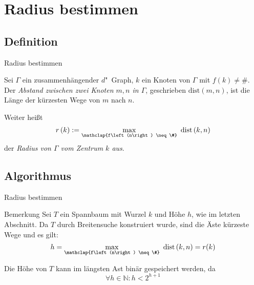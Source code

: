 \documentclass[18pt]{beamer}
\newcommand{\defWord}[1]{\emph{#1}}
\begin{document}
\section{Radius bestimmen}
\subsection{Definition}
\begin{frame}{Radius bestimmen}
	\begin{definition}[Abstand]
		Sei $\Gamma$ ein zusammenhängender $d$"~Graph, $k$ ein Knoten von $\Gamma$ mit $f\left(k\right) \neq \#$.
		Der \defWord{Abstand zwischen zwei Knoten $m, n$ in $\Gamma$}, geschrieben $\text{dist}\left(m , n\right)$, ist die Länge der kürzesten Wege von $m$ nach $n$.
	\end{definition}
	\begin{definition}[Radius]
		Weiter heißt
		\begin{displaymath}
			r\left(k\right) := \max_{\mathclap{f\left(n\right) \neq \#}} \text{ dist}\left(k, n\right)
		\end{displaymath}
		der \defWord{Radius von $\Gamma$ vom Zentrum $k$ aus}.
	\end{definition}
\end{frame}
\subsection{Algorithmus}
\begin{frame}{Radius bestimmen}
	\begin{exampleblock}{Bemerkung}
		Sei $T$ ein Spannbaum mit Wurzel $k$ und Höhe $h$, wie im letzten Abschnitt. Da $T$ durch Breitensuche konstruiert wurde, sind die Äste kürzeste Wege und es gilt:
		\begin{displaymath}
			h = \max_{\mathclap{f\left(n\right) \neq \#}} \text{ dist}\left(k, n\right) = r(k)
		\end{displaymath}
		
		Die Höhe von $T$ kann im längsten Ast binär gespeichert werden, da
		\begin{displaymath}
			\forall h \in \mathbb{N} : h < 2^{h + 1}
		\end{displaymath}
	\end{exampleblock}
\end{frame}
\end{document}

